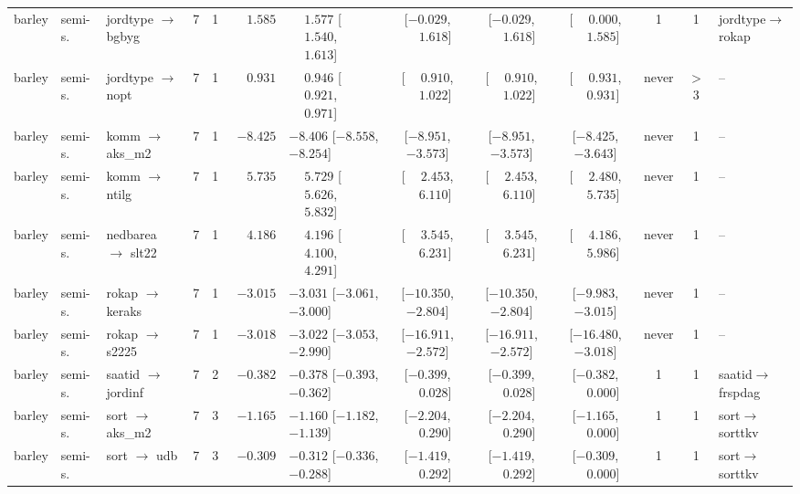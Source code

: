 \begin{landscape}
\begin{longtable}{@{}llp{2.15cm}ccrl cccc c l@{}}
barley & semi-s. & jordtype $\to$ bgbyg & 7 & 1 & $\phantom{-}1.585$ & $\phantom{-}1.577$ [$\phantom{-}1.540$, $\phantom{-}1.613$] & [$-0.029$, $\phantom{-}1.618$] & [$-0.029$, $\phantom{-}1.618$] & [$\phantom{-}0.000$, $\phantom{-}1.585$] & 1 & 1 & jordtype$\to$rokap \\
barley & semi-s. & jordtype $\to$ nopt & 7 & 1 & $\phantom{-}0.931$ & $\phantom{-}0.946$ [$\phantom{-}0.921$, $\phantom{-}0.971$] & [$\phantom{-}0.910$, $\phantom{-}1.022$] & [$\phantom{-}0.910$, $\phantom{-}1.022$] & [$\phantom{-}0.931$, $\phantom{-}0.931$] & never & $>$3 & -- \\
barley & semi-s. & komm $\to$ aks\_\allowbreak{}m2 & 7 & 1 & $-8.425$ & $-8.406$ [$-8.558$, $-8.254$] & [$-8.951$, $-3.573$] & [$-8.951$, $-3.573$] & [$-8.425$, $-3.643$] & never & 1 & -- \\
barley & semi-s. & komm $\to$ ntilg & 7 & 1 & $\phantom{-}5.735$ & $\phantom{-}5.729$ [$\phantom{-}5.626$, $\phantom{-}5.832$] & [$\phantom{-}2.453$, $\phantom{-}6.110$] & [$\phantom{-}2.453$, $\phantom{-}6.110$] & [$\phantom{-}2.480$, $\phantom{-}5.735$] & never & 1 & -- \\
barley & semi-s. & nedbarea $\to$ slt22 & 7 & 1 & $\phantom{-}4.186$ & $\phantom{-}4.196$ [$\phantom{-}4.100$, $\phantom{-}4.291$] & [$\phantom{-}3.545$, $\phantom{-}6.231$] & [$\phantom{-}3.545$, $\phantom{-}6.231$] & [$\phantom{-}4.186$, $\phantom{-}5.986$] & never & 1 & -- \\
barley & semi-s. & rokap $\to$ keraks & 7 & 1 & $-3.015$ & $-3.031$ [$-3.061$, $-3.000$] & [$-10.350$, $-2.804$] & [$-10.350$, $-2.804$] & [$-9.983$, $-3.015$] & never & 1 & -- \\
barley & semi-s. & rokap $\to$ s2225 & 7 & 1 & $-3.018$ & $-3.022$ [$-3.053$, $-2.990$] & [$-16.911$, $-2.572$] & [$-16.911$, $-2.572$] & [$-16.480$, $-3.018$] & never & 1 & -- \\
barley & semi-s. & saatid $\to$ jordinf & 7 & 2 & $-0.382$ & $-0.378$ [$-0.393$, $-0.362$] & [$-0.399$, $\phantom{-}0.028$] & [$-0.399$, $\phantom{-}0.028$] & [$-0.382$, $\phantom{-}0.000$] & 1 & 1 & saatid$\to$frspdag \\
barley & semi-s. & sort $\to$ aks\_\allowbreak{}m2 & 7 & 3 & $-1.165$ & $-1.160$ [$-1.182$, $-1.139$] & [$-2.204$, $\phantom{-}0.290$] & [$-2.204$, $\phantom{-}0.290$] & [$-1.165$, $\phantom{-}0.000$] & 1 & 1 & sort$\to$sorttkv \\
barley & semi-s. & sort $\to$ udb & 7 & 3 & $-0.309$ & $-0.312$ [$-0.336$, $-0.288$] & [$-1.419$, $\phantom{-}0.292$] & [$-1.419$, $\phantom{-}0.292$] & [$-0.309$, $\phantom{-}0.000$] & 1 & 1 & sort$\to$sorttkv \\

\end{longtable}
\end{landscape}
